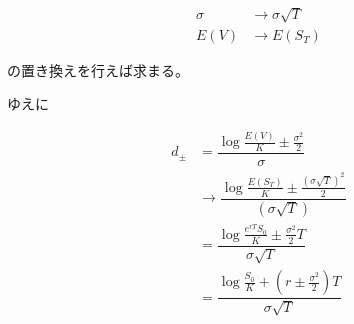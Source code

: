 \documentclass[uplatex]{jsarticle}
\begin{document}
\begin{align}
	\sigma & \to \sigma \sqrt{T} \\
	E(V)   & \to E(S_T)
\end{align}

の置き換えを行えば求まる。

ゆえに

\begin{align}
	d_{\pm} & = \dfrac{ \log \frac{E(V)}{K} \pm \frac{\sigma^{2}}{2} }{ \sigma }                             \\
	        & \to \dfrac{ \log \frac{E(S_{T})}{K} \pm \frac{(\sigma \sqrt{T})^{2}}{2} }{ (\sigma \sqrt{T}) } \\
	        & = \dfrac{ \log \frac{ e^{rT} S_{0} }{K} \pm \frac{\sigma^{2}}{2}T }{ \sigma \sqrt{T} }         \\
	        & = \dfrac{ \log \frac{S_{0}}{K} + ( r \pm \frac{\sigma^{2}}{2})T }{ \sigma \sqrt{T} }
\end{align}
\end{document}
